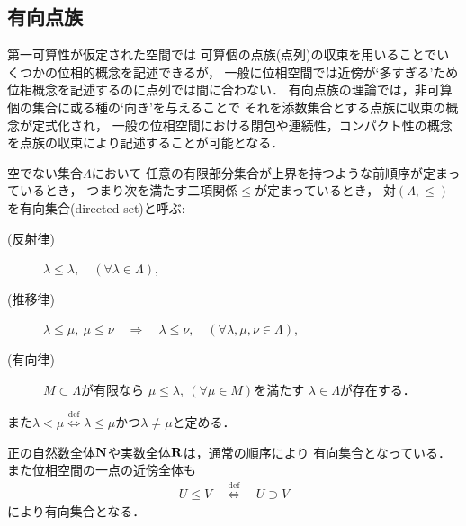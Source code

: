 \subsection{有向点族}
	第一可算性が仮定された空間では
	可算個の点族(点列)の収束を用いることでいくつかの位相的概念を記述できるが，
	一般に位相空間では近傍が`多すぎる'ため位相概念を記述するのに点列では間に合わない．
	有向点族の理論では，非可算個の集合に或る種の`向き'を与えることで
	それを添数集合とする点族に収束の概念が定式化され，
	一般の位相空間における閉包や連続性，コンパクト性の概念を点族の収束により記述することが可能となる．
	
	\begin{screen}
		\begin{dfn}[有向集合]
			空でない集合$\Lambda$において
			任意の有限部分集合が上界を持つような前順序が定まっているとき，
			つまり次を満たす二項関係$\leq$が定まっているとき，
			対$(\Lambda,\leq)$を有向集合(directed set)と呼ぶ:
			\begin{description}
				\item[(反射律)] $\lambda \leq \lambda,\quad (\forall \lambda \in \Lambda)$,
				\item[(推移律)] $\lambda \leq \mu,\ \mu \leq \nu 
					\quad \Longrightarrow \quad \lambda \leq \nu,\quad 
					(\forall \lambda,\mu,\nu \in \Lambda)$,
				\item[(有向律)] 
					$M \subset \Lambda$が有限なら
					$\mu \leq \lambda,\ (\forall \mu \in M)$を満たす
					$\lambda \in \Lambda$が存在する．
			\end{description}
			また$\lambda < \mu \overset{\mathrm{def}}{\Longleftrightarrow} 
			\mbox{$\lambda \leq \mu$かつ$\lambda \neq \mu$}$と定める．
		\end{dfn}
	\end{screen}
	正の自然数全体$\mathbf{N}$や実数全体$\mathbf{R}$は，通常の順序により
	有向集合となっている．また位相空間の一点の近傍全体も
	\begin{align}
		U \leq V \quad \overset{\mathrm{def}}{\Longleftrightarrow} \quad
		U \supset V
	\end{align}
	により有向集合となる．
	
